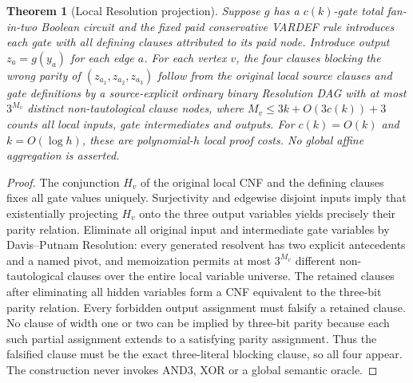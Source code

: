 \documentclass[11pt]{article}
\newtheorem{theorem}{Theorem}
\begin{document}
\begin{theorem}[Local Resolution projection]
Suppose $g$ has a $c(k)$-gate total fan-in-two Boolean circuit and the fixed paid conservative VARDEF rule introduces each gate with all defining clauses attributed to its paid node. Introduce output $z_a=g(y_a)$ for each edge $a$. For each vertex $v$, the four clauses blocking the wrong parity of $(z_{a_1},z_{a_2},z_{a_3})$ follow from the original local source clauses and gate definitions by a source-explicit ordinary binary Resolution DAG with at most $3^{M_v}$ distinct non-tautological clause nodes, where $M_v\le3k+O(3c(k))+3$ counts all local inputs, gate intermediates and outputs. For $c(k)=O(k)$ and $k=O(\log h)$, these are polynomial-$h$ \emph{local} proof costs. No global affine aggregation is asserted.
\end{theorem}
\begin{proof}
The conjunction $H_v$ of the original local CNF and the defining clauses fixes all gate values uniquely. Surjectivity and edgewise disjoint inputs imply that existentially projecting $H_v$ onto the three output variables yields precisely their parity relation. Eliminate all original input and intermediate gate variables by Davis--Putnam Resolution: every generated resolvent has two explicit antecedents and a named pivot, and memoization permits at most $3^{M_v}$ different non-tautological clauses over the entire local variable universe. The retained clauses after eliminating all hidden variables form a CNF equivalent to the three-bit parity relation. Every forbidden output assignment must falsify a retained clause. No clause of width one or two can be implied by three-bit parity because each such partial assignment extends to a satisfying parity assignment. Thus the falsified clause must be the exact three-literal blocking clause, so all four appear. The construction never invokes AND3, XOR or a global semantic oracle.
\end{proof}
\end{document}
